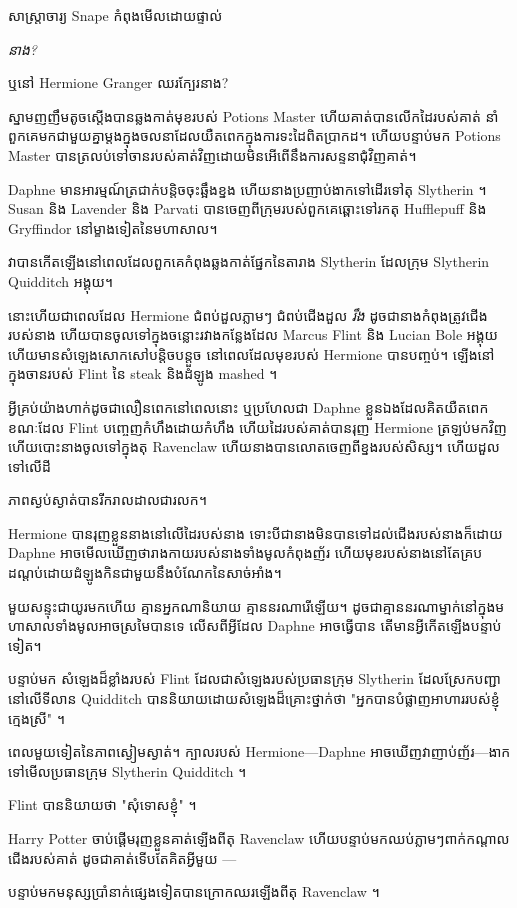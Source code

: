 {{{សាស្រ្តាចារ្យ Snape កំពុងមើលដោយផ្ទាល់

\emph{នាង?}

ឬនៅ Hermione Granger ឈរក្បែរនាង?

ស្នាមញញឹមតូចស្តើងបានឆ្លងកាត់មុខរបស់ Potions Master ហើយគាត់បានលើកដៃរបស់គាត់ នាំពួកគេមកជាមួយគ្នាម្តងក្នុងចលនាដែលយឺតពេកក្នុងការទះដៃពិតប្រាកដ។ ហើយបន្ទាប់មក Potions Master បានត្រលប់ទៅចានរបស់គាត់វិញដោយមិនអើពើនឹងការសន្ទនាជុំវិញគាត់។

Daphne មានអារម្មណ៍ត្រជាក់បន្តិចចុះឆ្អឹងខ្នង ហើយនាងប្រញាប់ងាកទៅដើរទៅតុ Slytherin ។ Susan និង Lavender និង Parvati បានចេញពីក្រុមរបស់ពួកគេឆ្ពោះទៅរកតុ Hufflepuff និង Gryffindor នៅម្ខាងទៀតនៃមហាសាល។

វាបានកើតឡើងនៅពេលដែលពួកគេកំពុងឆ្លងកាត់ផ្នែកនៃតារាង Slytherin ដែលក្រុម Slytherin Quidditch អង្គុយ។

នោះហើយជាពេលដែល Hermione ជំពប់ដួលភ្លាមៗ ជំពប់ជើងដួល \emph{រឹង} ដូចជានាងកំពុងត្រូវជើងរបស់នាង ហើយបានចូលទៅក្នុងចន្លោះរវាងកន្លែងដែល Marcus Flint និង Lucian Bole អង្គុយ ហើយមានសំឡេងសោកសៅបន្តិចបន្តួច នៅពេលដែលមុខរបស់ Hermione បានបញ្ចប់។ ឡើងនៅក្នុងចានរបស់ Flint នៃ steak និងដំឡូង mashed ។

អ្វីគ្រប់យ៉ាងហាក់ដូចជាលឿនពេកនៅពេលនោះ ឬប្រហែលជា Daphne ខ្លួនឯងដែលគិតយឺតពេក ខណៈដែល Flint បញ្ចេញកំហឹងដោយកំហឹង ហើយដៃរបស់គាត់បានរុញ Hermione ត្រឡប់មកវិញ ហើយបោះនាងចូលទៅក្នុងតុ Ravenclaw ហើយនាងបានលោតចេញពីខ្នងរបស់សិស្ស។ ហើយដួលទៅលើដី

ភាពស្ងប់ស្ងាត់បានរីករាលដាលជារលក។

Hermione បានរុញខ្លួននាងនៅលើដៃរបស់នាង ទោះបីជានាងមិនបានទៅដល់ជើងរបស់នាងក៏ដោយ Daphne អាចមើលឃើញថារាងកាយរបស់នាងទាំងមូលកំពុងញ័រ ហើយមុខរបស់នាងនៅតែគ្របដណ្ដប់ដោយដំឡូងកិនជាមួយនឹងបំណែកនៃសាច់អាំង។

មួយ​សន្ទុះ​ជា​យូរ​មក​ហើយ គ្មាន​អ្នក​ណា​និយាយ គ្មាន​នរណា​រើ​ឡើយ។ ដូចជាគ្មាននរណាម្នាក់នៅក្នុងមហាសាលទាំងមូលអាចស្រមៃបានទេ លើសពីអ្វីដែល Daphne អាចធ្វើបាន តើមានអ្វីកើតឡើងបន្ទាប់ទៀត។

បន្ទាប់មក សំឡេងដ៏ខ្លាំងរបស់ Flint ដែលជាសំឡេងរបស់ប្រធានក្រុម Slytherin ដែលស្រែកបញ្ជានៅលើទីលាន Quidditch បាននិយាយដោយសំឡេងដ៏គ្រោះថ្នាក់ថា "អ្នកបានបំផ្លាញអាហាររបស់ខ្ញុំ ក្មេងស្រី" ។

ពេលមួយទៀតនៃភាពស្ងៀមស្ងាត់។ ក្បាលរបស់ Hermione—Daphne អាចឃើញវាញាប់ញ័រ—ងាកទៅមើលប្រធានក្រុម Slytherin Quidditch ។

Flint បាននិយាយថា "សុំទោសខ្ញុំ" ។

Harry Potter ចាប់ផ្តើមរុញខ្លួនគាត់ឡើងពីតុ Ravenclaw ហើយបន្ទាប់មកឈប់ភ្លាមៗពាក់កណ្តាលជើងរបស់គាត់ ដូចជាគាត់ទើបតែគិតអ្វីមួយ —

បន្ទាប់មកមនុស្សប្រាំនាក់ផ្សេងទៀតបានក្រោកឈរឡើងពីតុ Ravenclaw ។

}}}
